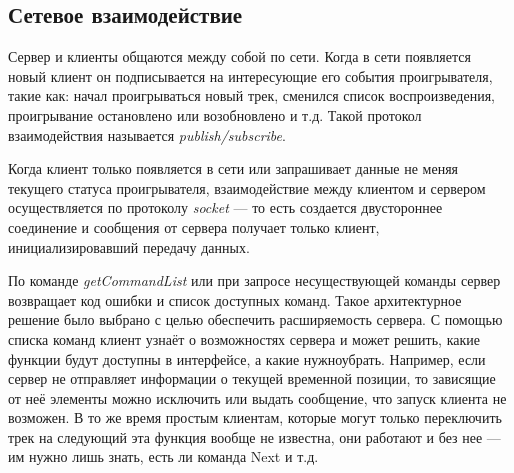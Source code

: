 \subsection{ Сетевое взаимодействие}

Сервер и клиенты общаются между собой по сети. Когда в сети появляется
новый клиент он подписывается на интересующие его события
проигрывателя, такие как: начал проигрываться новый трек, сменился
список воспроизведения, проигрывание остановлено или возобновлено и
т.д. Такой протокол взаимодействия называется
\textit{publish/subscribe}.

Когда клиент только появляется в сети или запрашивает данные не меняя
текущего статуса проигрывателя, взаимодействие между клиентом и
сервером осуществляется по протоколу \textit{socket} ---
то есть создается двустороннее соединение и сообщения от сервера получает
только клиент, инициализировавший передачу данных.

По команде \textit{getCommandList} или при запросе несуществующей
команды сервер возвращает код ошибки и список доступных команд. Такое
архитектурное решение было выбрано с целью обеспечить расширяемость
сервера. С помощью списка команд клиент узнаёт о возможностях сервера
и может решить, какие функции будут доступны в интерфейсе, а какие
нужноубрать. Например, если сервер не отправляет информации о текущей
временной позиции, то зависящие от неё элементы можно исключить или
выдать сообщение, что запуск клиента не возможен. В то же время
простым клиентам, которые могут только переключить трек на следующий
эта функция вообще не известна, они работают и без нее --- им нужно
лишь знать, есть ли команда Next и т.д.
